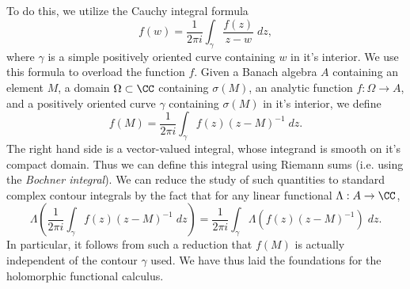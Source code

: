 To do this, we utilize the Cauchy integral formula
%
\[ f(w) = \frac{1}{2\pi i} \int_\gamma \frac{f(z)}{z - w} \; dz, \]
%
where $\gamma$ is a simple positively oriented curve containing $w$ in it's interior. We use this formula to overload the function $f$. Given a Banach algebra $A$ containing an element $M$, a domain $\Omega \subset \CC$ containing $\sigma(M)$, an analytic function $f: \Omega \to A$, and a positively oriented curve $\gamma$ containing $\sigma(M)$ in it's interior, we define
%
\[ f(M) = \frac{1}{2 \pi i} \int_\gamma f(z) (z - M)^{-1}\; dz. \]
%
The right hand side is a vector-valued integral, whose integrand is smooth on it's compact domain. Thus we can define this integral using Riemann sums (i.e. using the \emph{Bochner integral}). We can reduce the study of such quantities to standard complex contour integrals by the fact that for any linear functional $\Lambda: A \to \CC$,
%
\[ \Lambda \left( \frac{1}{2 \pi i} \int_\gamma f(z) (z - M)^{-1}\; dz \right) = \frac{1}{2 \pi i} \int_\gamma \Lambda \left( f(z) (z - M)^{-1} \right)\; dz. \]
%
In particular, it follows from such a reduction that $f(M)$ is actually independent of the contour $\gamma$ used. We have thus laid the foundations for the holomorphic functional calculus.

